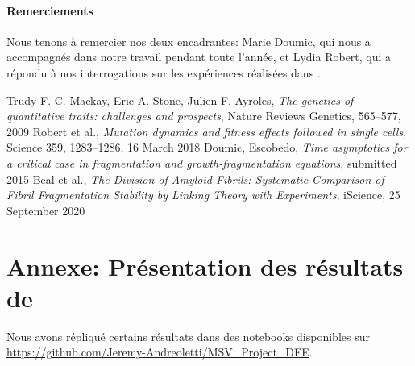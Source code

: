 \documentclass[12pt]{article}
\begin{document}
  \paragraph{Remerciements}

  Nous tenons à remercier nos deux encadrantes: Marie Doumic, qui nous a accompagnés dans notre travail pendant toute l'année, et Lydia Robert, qui a répondu à nos interrogations sur les expériences réalisées dans \cite{rob}.
  
\newpage

\begin{thebibliography}{1}

  Trudy F. C. Mackay, Eric A. Stone, Julien F. Ayroles,
  \emph{The genetics of quantitative traits: challenges and prospects}, Nature Reviews Genetics, 565–577, 2009
  Robert et al.,
  \emph{Mutation dynamics and fitness effects followed in single cells}, Science 359, 1283–1286, 16 March 2018
  Doumic, Escobedo,
  \emph{Time asymptotics for a critical case in fragmentation and growth-fragmentation equations}, submitted 2015
  Beal et al.,
  \emph{The Division of Amyloid Fibrils: Systematic Comparison of Fibril Fragmentation Stability by Linking Theory with Experiments}, iScience, 25 September 2020
\end{thebibliography}





\newpage

\appendix

\FloatBarrier
\section{Annexe: Présentation des résultats de \cite{rob}}\label{ann:resultats}

Nous avons répliqué certains résultats dans des notebooks disponibles sur \url{https://github.com/Jeremy-Andreoletti/MSV_Project_DFE}.
%
\end{document}
